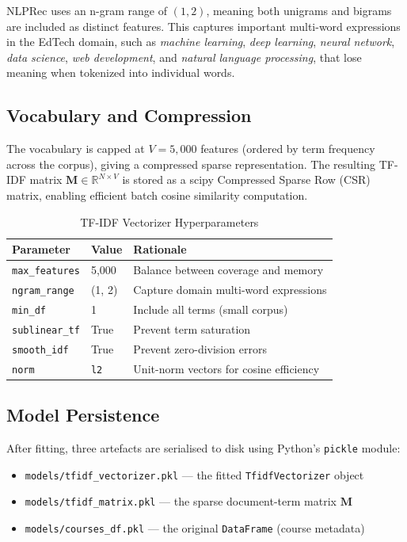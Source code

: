 \documentclass[12pt, a4paper]{article}
\begin{document}
NLPRec uses an n-gram range of $(1, 2)$, meaning both unigrams and bigrams are included as
distinct features. This captures important multi-word expressions in the EdTech domain, such as
\textit{machine learning}, \textit{deep learning}, \textit{neural network}, \textit{data science},
\textit{web development}, and \textit{natural language processing}, that lose meaning when
tokenized into individual words.

\subsection{Vocabulary and Compression}

The vocabulary is capped at $V = 5{,}000$ features (ordered by term frequency across the corpus),
giving a compressed sparse representation. The resulting TF-IDF matrix $\mathbf{M} \in
\mathbb{R}^{N \times V}$ is stored as a scipy Compressed Sparse Row (CSR) matrix, enabling
efficient batch cosine similarity computation.

\begin{table}[htbp]
\centering
\caption{TF-IDF Vectorizer Hyperparameters}
\label{tab:tfidf_params}
\renewcommand{\arraystretch}{1.3}
\begin{tabular}{lll}
\toprule
\textbf{Parameter} & \textbf{Value} & \textbf{Rationale} \\
\midrule
\texttt{max\_features} & 5,000 & Balance between coverage and memory \\
\texttt{ngram\_range} & (1, 2) & Capture domain multi-word expressions \\
\texttt{min\_df} & 1 & Include all terms (small corpus) \\
\texttt{sublinear\_tf} & True & Prevent term saturation \\
\texttt{smooth\_idf} & True & Prevent zero-division errors \\
\texttt{norm} & \texttt{l2} & Unit-norm vectors for cosine efficiency \\
\bottomrule
\end{tabular}
\end{table}

\subsection{Model Persistence}

After fitting, three artefacts are serialised to disk using Python's \texttt{pickle} module:
\begin{itemize}
    \item \texttt{models/tfidf\_vectorizer.pkl} — the fitted \texttt{TfidfVectorizer} object
    \item \texttt{models/tfidf\_matrix.pkl} — the sparse document-term matrix $\mathbf{M}$
    \item \texttt{models/courses\_df.pkl} — the original \texttt{DataFrame} (course metadata)
\end{itemize}
\end{document}
